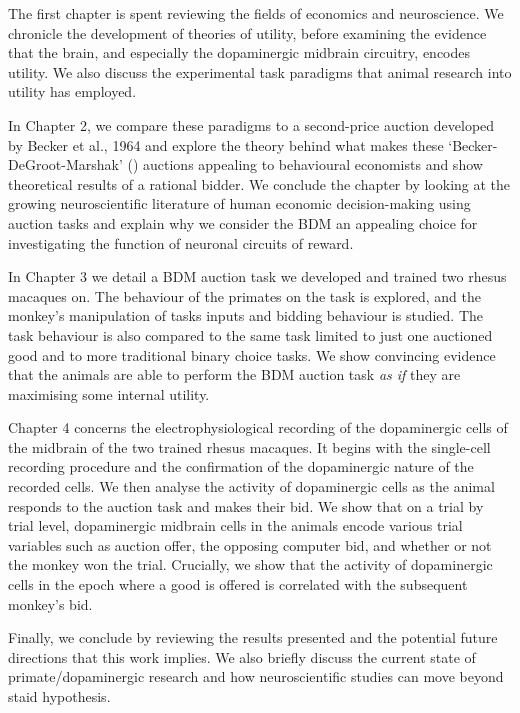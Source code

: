 
\begin{organisation}
The first chapter is spent reviewing the fields of economics and neuroscience. We chronicle the development of theories of utility, before examining the evidence that the brain, and especially the dopaminergic midbrain circuitry, encodes utility. We also discuss the experimental task paradigms that animal research into utility has employed.

In Chapter 2, we compare these paradigms to a second-price auction developed by Becker et al., 1964 and explore the theory behind what makes these ‘Becker-DeGroot-Marshak’ () auctions appealing to behavioural economists and show theoretical results of a rational bidder. We conclude the chapter by looking at the growing neuroscientific literature of human economic decision-making using auction tasks and explain why we consider the BDM an appealing choice for investigating the function of neuronal circuits of reward. 

In Chapter 3 we detail a BDM auction task we developed and trained two rhesus macaques on. The behaviour of the primates on the task is explored, and the monkey's manipulation of tasks inputs and bidding behaviour is studied. The task behaviour is also compared to the same task limited to just one auctioned good and to more traditional binary choice tasks. We show convincing evidence that the animals are able to perform the BDM auction task \textit{as if} they are maximising some internal utility.

Chapter 4 concerns the electrophysiological recording of the dopaminergic cells of the midbrain of the two trained rhesus macaques. It begins with the single-cell recording procedure and the confirmation of the dopaminergic nature of the recorded cells. We then analyse the activity of dopaminergic cells as the animal responds to the auction task and makes their bid. We show that on a trial by trial level, dopaminergic midbrain cells in the animals encode various trial variables such as auction offer, the opposing computer bid, and whether or not the monkey won the trial. Crucially, we show that the activity of dopaminergic cells in the epoch where a good is offered is correlated with the subsequent monkey's bid.

Finally, we conclude by reviewing the results presented and the potential future directions that this work implies. We also briefly discuss the current state of primate/dopaminergic research and how neuroscientific studies can move beyond staid hypothesis.

\end{organisation}
